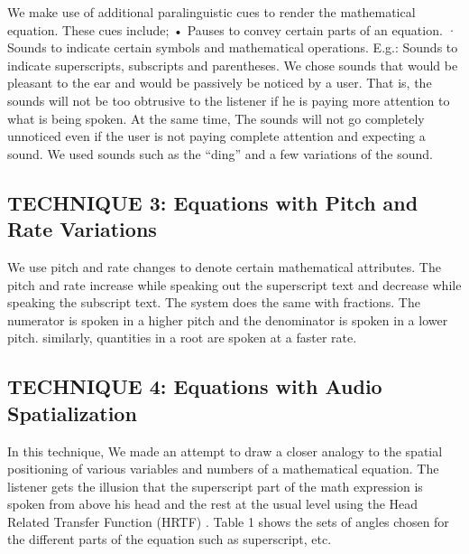 \documentclass{article}
\begin{document}
We make use of additional paralinguistic cues to render the mathematical equation. These cues include;
• Pauses to convey certain parts of an equation.
· Sounds to indicate certain symbols and mathematical operations.
E.g.: Sounds to indicate superscripts, subscripts and parentheses. We chose sounds that would be pleasant to the ear and would be passively be noticed by a user. That is, the sounds will not be too obtrusive to the listener if he is paying more attention to what is being spoken. At the same time, The sounds will not go completely unnoticed even if the user is not paying complete attention and expecting a sound. We used sounds such as the “ding” and a few variations of the sound.


\subsection{TECHNIQUE 3: Equations with Pitch and Rate Variations}
\label{ssec:subhead}

We use pitch and rate changes to denote certain mathematical attributes. The pitch and rate increase while speaking out the superscript text and decrease while speaking the subscript text. The system does the same with fractions. The numerator is spoken in a higher pitch and the denominator is spoken in a lower pitch. similarly, quantities in a root are spoken at a faster rate.






\subsection{TECHNIQUE 4: Equations with Audio Spatialization}
\label{ssec:subhead}

In this technique, We made an attempt to draw a closer analogy to the spatial positioning of various variables and numbers of a mathematical equation. The listener gets the illusion that the superscript part of the math expression is spoken from above his head and the rest at the usual level using the Head Related Transfer Function (HRTF) \cite{} . Table 1 shows the sets of angles chosen for the different parts of the equation such as superscript, etc. 
\end{document}
